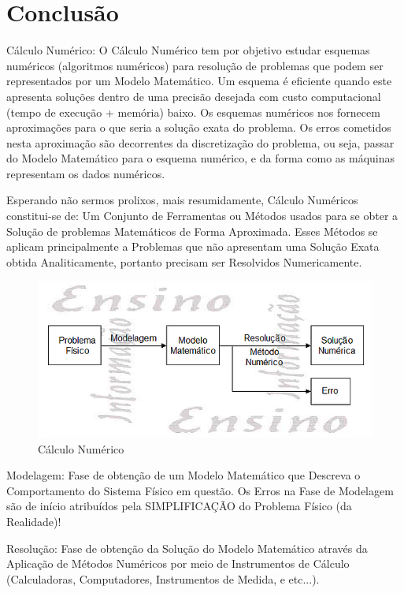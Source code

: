 \documentclass{article}
\begin{document}
\section{Conclusão}

Cálculo Numérico: O Cálculo Numérico tem por objetivo estudar esquemas numéricos (algoritmos numéricos) para resolução de problemas que podem ser representados por um Modelo Matemático. Um esquema é eficiente quando este apresenta soluções dentro de uma precisão desejada com custo computacional (tempo de execução + memória) baixo. Os esquemas numéricos nos fornecem aproximações para o que seria a solução exata do problema. Os erros cometidos nesta aproximação são decorrentes da discretização do problema, ou seja, passar do Modelo Matemático para o esquema numérico, e da forma como as máquinas representam os dados numéricos.

Esperando não sermos prolixos, mais resumidamente, Cálculo Numéricos constitui-se de: Um Conjunto de Ferramentas ou Métodos usados para se obter a Solução de problemas Matemáticos de Forma Aproximada. Esses Métodos se aplicam principalmente a Problemas que não apresentam uma Solução Exata obtida Analiticamente, portanto precisam ser Resolvidos Numericamente.

\begin{figure}[h!]
\centering
\includegraphics[scale=0.85]{SolucaoCalculoNumerico}
\caption{Cálculo Numérico}
\label{fig:SolucaoCalculoNumerico}
\end{figure}

Modelagem: Fase de obtenção de um Modelo Matemático que Descreva o Comportamento do Sistema Físico em questão. Os Erros na Fase de Modelagem são de início atribuídos pela SIMPLIFICAÇÃO do Problema Físico (da Realidade)!

Resolução: Fase de obtenção da Solução do Modelo Matemático através da Aplicação de Métodos Numéricos por meio de Instrumentos de Cálculo (Calculadoras, Computadores, Instrumentos de Medida, e etc...).
\end{document}
